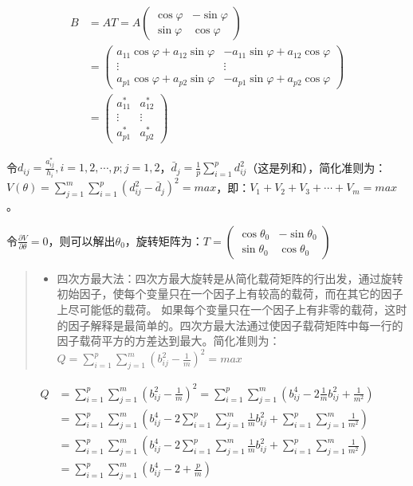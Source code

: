 \documentclass[]{ctexbook}
\providecommand{\tightlist}{%
  \setlength{\itemsep}{0pt}\setlength{\parskip}{0pt}}
\begin{document}
\[\begin {aligned}B&=AT=A\begin {pmatrix}\cos\varphi&-\sin\varphi\\\sin\varphi&\cos\varphi \end {pmatrix}\\&=\begin {pmatrix}a_{11}\cos\varphi+a_{12}\sin\varphi&-a_{11}\sin\varphi+a_{12}\cos\varphi\\\vdots&\vdots\\a_{p1}\cos\varphi+a_{p2}\sin\varphi&-a_{p1}\sin\varphi+a_{p2}\cos\varphi \end {pmatrix}\\&=\begin {pmatrix}a_{11}^{\ast}&a_{12}^{\ast}\\\vdots&\vdots\\a_{p1}^{\ast}&a_{p2}^{\ast} \end {pmatrix} \end {aligned}\]

令\(d_{ij}=\frac{a_{ij}^{\ast}}{h_i},i=1,2,\cdots,p;j=1,2\)，\(\bar d_j=\frac{1}{p}\sum_{i=1}^pd_{ij}^2\)（这是列和），简化准则为：\(V(\theta)=\sum_{j=1}^m\sum_{i=1}^p(d_{ij}^2-\bar d_j)^2=max\)，即：\(V_1+V_2+V_3+\cdots+V_m=max\)。

令\(\frac{\partial V}{\partial \theta}=0\)，则可以解出\(\theta_0\)，旋转矩阵为：\(T=\begin {pmatrix}\cos\theta_0&-\sin\theta_0\\\sin\theta_0&\cos\theta_0 \end {pmatrix}\)

\begin{quote}
\begin{itemize}
\tightlist
\item
  四次方最大法：四次方最大旋转是从简化载荷矩阵的行出发，通过旋转初始因子，使每个变量只在一个因子上有较高的载荷，而在其它的因子上尽可能低的载荷。 如果每个变量只在一个因子上有非零的载荷，这时的因子解释是最简单的。四次方最大法通过使因子载荷矩阵中每一行的因子载荷平方的方差达到最大。简化准则为：\(Q=\sum_{i=1}^p\sum_{j=1}^m(b_{ij}^2-\frac{1}{m})^2=max\)
\end{itemize}
\end{quote}

\[\begin {aligned} Q&=\sum_{i=1}^p\sum_{j=1}^m(b_{ij}^2-\frac{1}{m})^2=\sum_{i=1}^p\sum_{j=1}^m(b_{ij}^4-2\frac{1}{m}b_{ij}^2+\frac{1}{m^2})\\&=\sum_{i=1}^p\sum_{j=1}^m(b_{ij}^4-2\sum_{i=1}^p\sum_{j=1}^m\frac{1}{m}b_{ij}^2+\sum_{i=1}^p\sum_{j=1}^m\frac{1}{m^2})\\&=\sum_{i=1}^p\sum_{j=1}^m(b_{ij}^4-2\sum_{i=1}^p\sum_{j=1}^m\frac{1}{m}b_{ij}^2+\sum_{i=1}^p\sum_{j=1}^m\frac{1}{m^2})\\&=\sum_{i=1}^p\sum_{j=1}^m(b_{ij}^4-2+\frac{p}{m}) \end {aligned}\]
\end{document}
